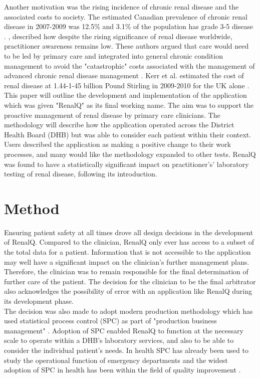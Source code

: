 ﻿\documentclass[11pt]{article}
\begin{document}
Another motivation was the rising incidence of chronic renal disease and the associated costs to society. The estimated Canadian prevalence of chronic renal disease in 2007-2009 was 12.5\% and 3.1\% of the population has grade 3-5 disease \citep{arora2013prevalence}. \citep{anachronistic}, described how despite the rising significance of renal disease worldwide, practitioner awareness remains low. These authors argued that care would need to be led by primary care and integrated into general chronic condition management to avoid the "catastrophic" costs associated with the management of advanced chronic renal disease management \citep{jha2013chronic}. Kerr et al. estimated the cost of renal disease at 1.44-1-45 billion Pound Stirling in 2009-2010 for the UK alone \citep{underestimating}.\\

This paper will outline the development and implementation of the application which was given "RenalQ" as its final working name. The aim was to support the proactive management of renal disease by primary care clinicians. The methodology will describe how the application operated across the District Health Board (DHB) but was able to consider each patient within their context.  Users described the application as making a positive change to their work processes, and many would like the methodology expanded to other tests. RenalQ was found to have a statistically significant impact on practitioner's' laboratory testing of renal disease, following its introduction.\\

\section{Method}
Ensuring patient safety at all times drove all design decisions in the development of RenalQ. Compared to the clinician, RenalQ only ever has access to a subset of the total data for  a patient. Information that is not accessible to the application may well have a significant impact on the clinician's further management plans. Therefore, the clinician was to remain responsible for the final determination of further care of the patient.   The decision for the clinician to be the final arbitrator also acknowledges the possibility of error with an application like RenalQ during its development phase. \\

The decision was also made to adopt modern production methodology which has used statistical process control (SPC) as part of "production business management" \citep{rosemann2015six, cheng2015run, epprecht2015statistical}. Adoption of SPC enabled RenalQ to function at the necessary scale to operate within a DHB's laboratory services, and also to  be able to consider the individual patient's needs. In health SPC has already been used to study the operational function of emergency departments \citep{pimentel2015statistical} and the widest adoption of SPC in health has been within the field of quality improvement \citep{provost2011health}.\\
\end{document}
